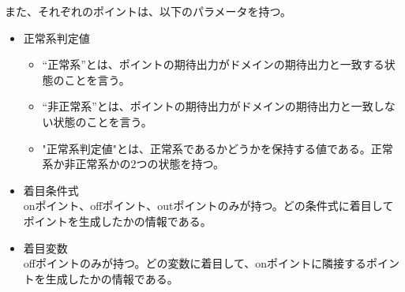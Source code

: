\documentclass[uplatex, report, a4j, 10pt]{jsbook}
\begin{document}
また、それぞれのポイントは、以下のパラメータを持つ。
\begin{itemize}
  \item 正常系判定値
        \begin{itemize}
          \item “正常系”とは、ポイントの期待出力がドメインの期待出力と一致する状態のことを言う。
          \item “非正常系”とは、ポイントの期待出力がドメインの期待出力と一致しない状態のことを言う。
          \item "正常系判定値"とは、正常系であるかどうかを保持する値である。正常系か非正常系かの2つの状態を持つ。
        \end{itemize}
  \item 着目条件式\\
        onポイント、offポイント、outポイントのみが持つ。どの条件式に着目してポイントを生成したかの情報である。
  \item 着目変数\\
        offポイントのみが持つ。どの変数に着目して、onポイントに隣接するポイントを生成したかの情報である。
\end{itemize}
\end{document}
